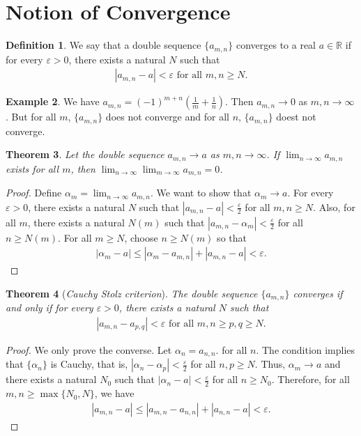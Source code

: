 \documentclass[15pt,a4paper]{book}
\newtheorem{theorem}{Theorem}[chapter]
\theoremstyle{definition}
\newtheorem{definition}[theorem]{Definition}
\newtheorem{example}[theorem]{Example}
\newcommand{\eax}[1]{\emph{#1}\index{#1}} %
\newcommand{\abs}[1]{\left| #1 \right|} %
\newcommand{\R}{\mathbb{R}} %
\begin{document}
\section{Notion of Convergence}

\begin{definition}
    We say that a double sequence $\{a_{m,n}\}$ converges to a real $a \in \R$ if for every $\varepsilon > 0$, there exists a natural $N$ such that
    \begin{align*}
        \abs{a_{m,n} - a} < \varepsilon \text{ for all } m,n \geq N.
    \end{align*}
\end{definition}

\begin{example}
    We have $a_{m,n} = (-1)^{m+n} \left( \frac{1}{m}+\frac{1}{n} \right)$. Then $a_{m,n} \to 0$ as $m,n \to \infty$. But for all $m$, $\{a_{m,n}\}$ does not converge and for all $n$, $\{a_{m,n}\}$ doest not converge.
\end{example}

\begin{theorem}
    Let the double sequence $a_{m,n} \to a$ as $m,n \to \infty$. If $\lim_{n \to \infty} a_{m,n}$ exists for all $m$, then $\lim_{n \to \infty} \lim_{m \to \infty} a_{m,n} = 0$.
\end{theorem}
\begin{proof}
    Define $\alpha_{m} = \lim_{n \to \infty} a_{m,n}$. We want to show that $\alpha_{m} \to a$. For every $\varepsilon > 0$, there exists a natural $N$ such that $\abs{a_{m,n} - a} < \frac{\varepsilon}{2}$ for all $m,n \geq N$. Also, for all $m$, there exists a natural $N(m)$ such that $\abs{a_{m,n} - \alpha_{m}} < \frac{\varepsilon}{2}$ for all $n \geq N(m)$. For all $m \geq N$, choose $n \geq N(m)$ so that
    \begin{align}
        \abs{\alpha_{m}-a} \leq \abs{\alpha_{m}-a_{m,n}} + \abs{a_{m,n} - a} < \varepsilon.
    \end{align}
\end{proof}

\begin{theorem}[\eax{Cauchy Stolz criterion}]
    The double sequence $\{a_{m,n}\}$ converges if and only if for every $\varepsilon > 0$, there exists a natural $N$ such that
    \begin{align*}
        \abs{a_{m,n}-a_{p,q}} < \varepsilon \text{ for all } m,n \geq p,q \geq N.
    \end{align*}
\end{theorem}
\begin{proof}
    We only prove the converse. Let $\alpha_{n} = a_{n,n}$. for all $n$. The condition implies that $\{\alpha_{n}\}$ is Cauchy, that is, $\abs{\alpha_{n}-\alpha_{p}} < \frac{\varepsilon}{2}$ for all $n,p \geq N$. Thus, $\alpha_{m} \to a$ and there exists a natural $N_{0}$ such that $\abs{\alpha_{n}-a} < \frac{\varepsilon}{2}$ for all $n \geq N_{0}$. Therefore, for all $m,n \geq \max \{N_{0},N\}$, we have
    \begin{align*}
        \abs{a_{m,n}-a} \leq \abs{a_{m,n}-a_{n,n}} + \abs{a_{n,n}-a} < \varepsilon.
    \end{align*}
\end{proof}
\end{document}
